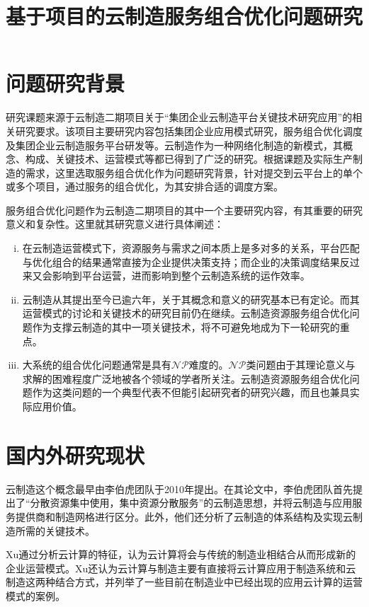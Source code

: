 \documentclass[UTF8]{ctexart}
\title{基于项目的云制造服务组合优化问题研究}
\date{}
\begin{document}
\maketitle
\section{问题研究背景}
\label{CriMod}
研究课题来源于云制造二期项目关于“集团企业云制造平台关键技术研究应用”的相关研究要求。该项目主要研究内容包括集团企业应用模式研究，服务组合优化调度及集团企业云制造服务平台研发等。云制造作为一种网络化制造的新模式，其概念、构成、关键技术、运营模式等都已得到了广泛的研究。根据课题及实际生产制造的需求，这里选取服务组合优化作为问题研究背景，针对提交到云平台上的单个或多个项目，通过服务的组合优化，为其安排合适的调度方案。

服务组合优化问题作为云制造二期项目的其中一个主要研究内容，有其重要的研究意义和复杂性。这里就其研究意义进行具体阐述：
\begin{enumerate}[(i)]
\item 在云制造运营模式下，资源服务与需求之间本质上是多对多的关系，平台匹配与优化组合的结果通常直接为企业提供决策支持；而企业的决策调度结果反过来又会影响到平台运营，进而影响到整个云制造系统的运作效率。
\item 云制造从其提出至今已逾六年，关于其概念和意义的研究基本已有定论。而其运营模式的讨论和关键技术的研究目前仍在继续。云制造资源服务组合优化问题作为支撑云制造的其中一项关键技术，将不可避免地成为下一轮研究的重点。
\item 大系统的组合优化问题通常是具有$\mathcal{NP}$难度的。$\mathcal{NP}$类问题由于其理论意义与求解的困难程度广泛地被各个领域的学者所关注。云制造资源服务组合优化问题作为这类问题的一个典型代表不但能引起研究者的研究兴趣，而且也兼具实际应用价值。
\end{enumerate}

\section{国内外研究现状}
\label{ResCon}
云制造这个概念最早由李伯虎团队\cite{LiBohu2010}于2010年提出。在其论文中，李伯虎团队首先提出了“分散资源集中使用，集中资源分散服务”的云制造思想，并将云制造与应用服务提供商和制造网格进行区分。此外，他们还分析了云制造的体系结构及实现云制造所需的关键技术。

Xu\cite{Xu2012}通过分析云计算的特征，认为云计算将会与传统的制造业相结合从而形成新的企业运营模式。Xu还认为云计算与制造主要有直接将云计算应用于制造系统和云制造这两种结合方式，并列举了一些目前在制造业中已经出现的应用云计算的运营模式的案例。
\end{document}
